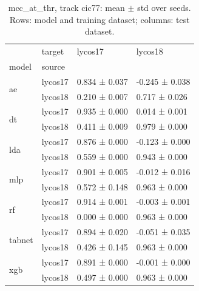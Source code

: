 \begin{table}
\caption{mcc_at_thr, track cic77: mean $\pm$ std over seeds. Rows: model and training dataset; columns: test dataset.}
\label{tab:matrix_cic77_mcc_at_thr}
\begin{tabular}{llll}
\toprule
 & target & lycos17 & lycos18 \\
model & source &  &  \\
\midrule
\multirow[t]{2}{*}{ae} & lycos17 & 0.834 ± 0.037 & -0.245 ± 0.038 \\
 & lycos18 & 0.210 ± 0.007 & 0.717 ± 0.026 \\
\cline{1-4}
\multirow[t]{2}{*}{dt} & lycos17 & 0.935 ± 0.000 & 0.014 ± 0.001 \\
 & lycos18 & 0.411 ± 0.009 & 0.979 ± 0.000 \\
\cline{1-4}
\multirow[t]{2}{*}{lda} & lycos17 & 0.876 ± 0.000 & -0.123 ± 0.000 \\
 & lycos18 & 0.559 ± 0.000 & 0.943 ± 0.000 \\
\cline{1-4}
\multirow[t]{2}{*}{mlp} & lycos17 & 0.901 ± 0.005 & -0.012 ± 0.016 \\
 & lycos18 & 0.572 ± 0.148 & 0.963 ± 0.000 \\
\cline{1-4}
\multirow[t]{2}{*}{rf} & lycos17 & 0.914 ± 0.001 & -0.003 ± 0.001 \\
 & lycos18 & 0.000 ± 0.000 & 0.963 ± 0.000 \\
\cline{1-4}
\multirow[t]{2}{*}{tabnet} & lycos17 & 0.894 ± 0.020 & -0.051 ± 0.035 \\
 & lycos18 & 0.426 ± 0.145 & 0.963 ± 0.000 \\
\cline{1-4}
\multirow[t]{2}{*}{xgb} & lycos17 & 0.891 ± 0.000 & -0.001 ± 0.000 \\
 & lycos18 & 0.497 ± 0.000 & 0.963 ± 0.000 \\
\cline{1-4}
\bottomrule
\end{tabular}
\end{table}
